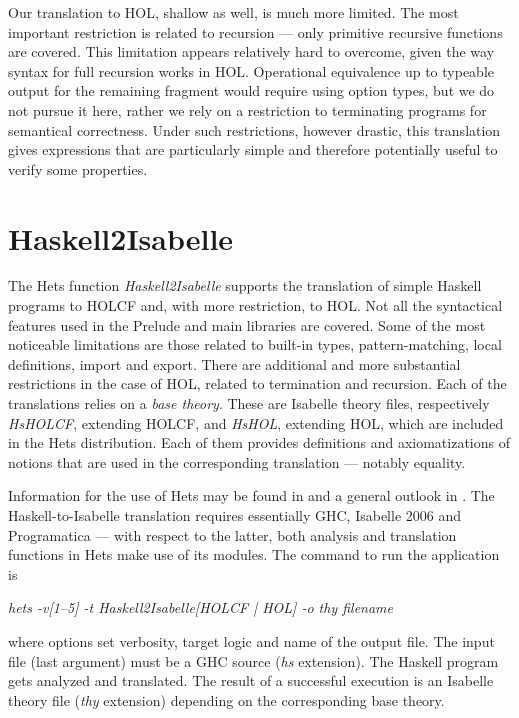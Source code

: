 \documentclass[a4paper,12pt]{article}
\begin{document}
Our translation to HOL, shallow as well, is much more limited. The
most important restriction is related to recursion --- only primitive
recursive functions are covered. This limitation appears relatively
hard to overcome, given the way syntax for full recursion works in
HOL. Operational equivalence up to typeable output for the remaining
fragment would require using option types, but we do not pursue it
here, rather we rely on a restriction to terminating programs for
semantical correctness. Under such restrictions, however drastic,
this translation gives expressions that are particularly simple and
therefore potentially useful to verify some properties.


\section{Haskell2Isabelle}

The Hets function \emph{Haskell2Isabelle} supports the translation of
simple Haskell programs to HOLCF and, with more restriction, to HOL.
Not all the syntactical features used in the Prelude and main
libraries are covered. Some of the most noticeable limitations are
those related to built-in types, pattern-matching, local definitions,
import and export. There are additional and more substantial
restrictions in the case of HOL, related to termination and recursion.
Each of the translations relies on a \emph{base theory}. These are
Isabelle theory files, respectively \emph{HsHOLCF}, extending HOLCF,
and \emph{HsHOL}, extending HOL, which are included in the Hets
distribution. Each of them provides definitions and axiomatizations of
notions that are used in the corresponding translation --- notably
equality.

Information for the use of Hets may be found in \cite{HetsUG} and a
general outlook in \cite{HetsUG}. The Haskell-to-Isabelle translation
requires essentially GHC, Isabelle 2006 and Programatica --- with
respect to the latter, both analysis and translation functions in Hets
make use of its modules.  The command to run the application is

\emph{hets -v[1--5] -t Haskell2Isabelle[HOLCF | HOL] -o thy filename}

\noindent where options set verbosity, target logic and name of the
output file. The input file (last argument) must be a GHC source
(\emph{hs} extension).  The Haskell program gets analyzed and
translated. The result of a successful execution is an Isabelle theory
file (\emph{thy} extension) depending on the corresponding base
theory.
\end{document}
